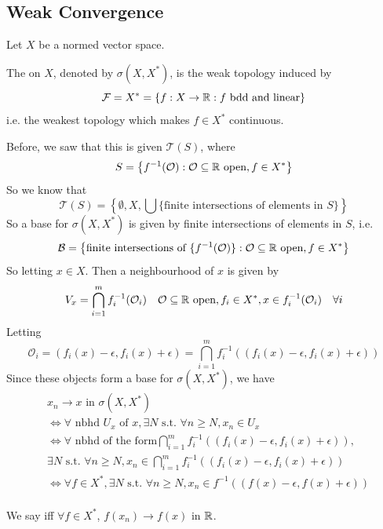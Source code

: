 \subsection{Weak Convergence}
Let $X$ be a normed vector space.
\begin{defn}
    The  on $X$, denoted by $\sigma(X, X^*)$, is the weak topology 
    induced by 
    \[
        \mathcal{F} = X^* = \left\{ f : X \to \mathbb{R} : f \text{ bdd and linear} \right\} 
    \]   
    i.e. the weakest topology which makes $f \in X^*$ continuous.
\end{defn} 
\begin{rem}
Before, we saw that this is given $\mathcal{T}(S)$, where 
\[
S = \left\{ f^{-1}(\mathcal{O}) : \mathcal{O} \subseteq \mathbb{R} \text{ open}, f \in X^* \right\}
\]
So we know that 
\[
    \mathcal{T}(S) = \left\{ \emptyset, X, \bigcup \{ \text{finite intersections of elements in } S \} \right\} 
\] 
So a base for $\sigma(X, X^*)$ is given by finite intersections of elements in $S$, i.e.
\[
    \mathcal{B} = \left\{ \text{finite intersections of } \{f^{-1}(\mathcal{O})\} : \mathcal{O} \subseteq \mathbb{R} \text{ open}, f \in X^* \right\} 
\] 
So letting $x \in X$. Then a neighbourhood of $x$ is given by
\[
    V_x = \bigcap_{i = 1}^m f^{-1}_i(\mathcal{O}_i) \quad \mathcal{O} \subseteq \mathbb{R} \text{ open}, f_i \in X^*, x \in f^{-1}_i(\mathcal{O}_i) \quad \forall i
\]   
Letting
 \[
\mathcal{O}_i = (f_i(x) - \epsilon, f_i(x) + \epsilon) = \bigcap_{i = 1}^m f_i^{-1}((f_i(x) - \epsilon, f_i(x) + \epsilon))
\]
Since these objects form a base for $\sigma(X, X^*)$, we have 
\begin{align*}
    &x_n \to x \text{ in } \sigma(X, X^*) \\
    &\iff \forall \text{ nbhd } U_x \text{ of } x, \exists N \text{ s.t. } \forall n \geq N, x_n \in U_x \\
    &\iff \forall \text{ nbhd of the form} \bigcap_{i = 1}^m f_i^{-1}((f_i(x) - \epsilon, f_i(x) + \epsilon)), \\
    &\exists N \text{ s.t. } \forall n \geq N, x_n \in \bigcap_{i = 1}^m f_i^{-1}((f_i(x) - \epsilon, f_i(x) + \epsilon)) \\
    &\iff \forall f \in X^*, \exists N \text{ s.t. } \forall n \geq N, x_n \in f^{-1}((f(x) - \epsilon, f(x) + \epsilon)) \\
\end{align*} 
\end{rem}

\begin{defn}
    We say  iff $\forall f \in X^*$, $f(x_n) \to f(x)$ in $\mathbb{R}$.
\end{defn}

